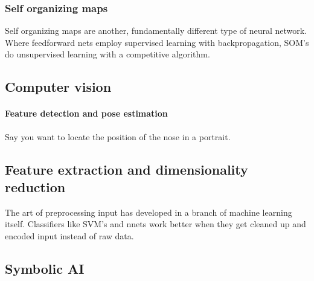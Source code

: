 \subsubsection{Self organizing maps}
Self organizing maps are another, fundamentally different type of neural network. Where feedforward nets employ supervised learning with backpropagation, SOM's do unsupervised learning with a competitive algorithm. 


\subsection{Computer vision}

\paragraph{Feature detection and pose estimation}

Say you want to locate the position of the nose in a portrait. 



\subsection{Feature extraction and dimensionality reduction}
The art of preprocessing input has developed in a branch of machine learning itself. Classifiers like SVM's and nnets work better when they get cleaned up and encoded input instead of raw data. 



\subsection{Symbolic AI}

